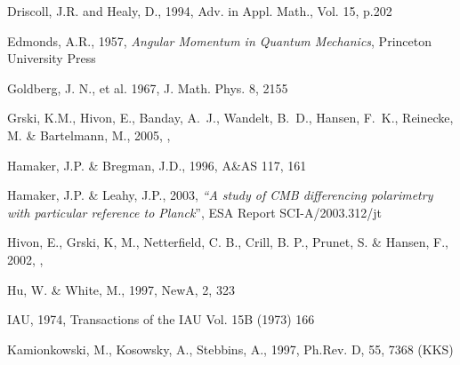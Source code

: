\documentclass[12pt,twoside]{article}
\begin{document}
\begin{thebibliography}{99}
Driscoll, J.R. and Healy, D., 1994, Adv. in Appl. Math., Vol. 15, p.202
\backrefprint%

Edmonds, A.R., 1957, {\em Angular Momentum in Quantum Mechanics}, Princeton
University Press
\backrefprint%

Goldberg, J. N., et al. 1967, J. Math. Phys. 8, 2155
\backrefprint%

  G{\oacute}rski, K.M., Hivon, E., Banday, A.~J., Wandelt,
  B.~D., Hansen, F.~K., Reinecke, M. \& Bartelmann, M., 2005, 
, 
\backrefprint%

Hamaker, J.P. \& Bregman, J.D., 1996, A\&AS 117, 161
\backrefprint%

  Hamaker, J.P. \& Leahy, J.P., 2003, {\em ``A study of CMB differencing
  polarimetry with particular reference to {\em Planck}}'', {\sc ESA Report SCI-A/2003.312/jt}
\backrefprint%

Hivon, E., G{\oacute}rski, K, M., Netterfield, C. B., Crill, B. P., Prunet, S. \& Hansen, F., 
2002, , 
\backrefprint%

Hu, W. \& White, M., 1997, NewA, 2, 323
\backrefprint%

IAU, 1974, Transactions of the IAU Vol. 15B (1973) 166
\backrefprint%

Kamionkowski, M., Kosowsky, A., Stebbins, A., 1997, Ph.Rev. D, 55, 7368 (KKS)
\backrefprint%


\end{thebibliography}
\end{document}
